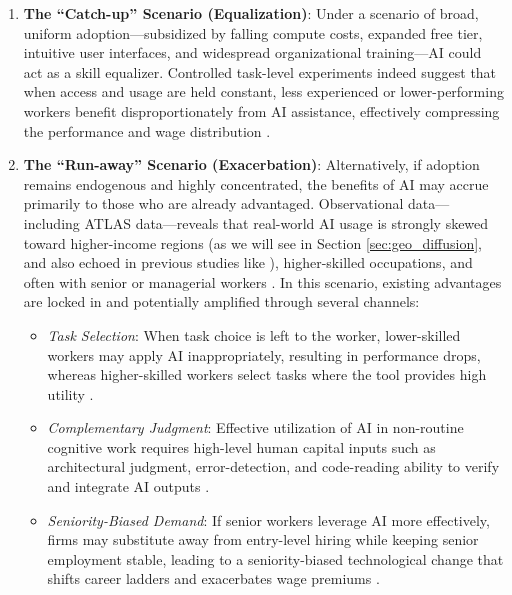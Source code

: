\documentclass[11pt,a4paper]{article}
\begin{document}
\begin{enumerate}
    \item \textbf{The ``Catch-up'' Scenario (Equalization)}: Under a scenario of broad, uniform adoption---subsidized by falling compute costs, expanded free tier, intuitive user interfaces, and widespread organizational training---AI could act as a skill equalizer. Controlled task-level experiments indeed suggest that when access and usage are held constant, less experienced or lower-performing workers benefit disproportionately from AI assistance, effectively compressing the performance and wage distribution \citep[e.g.,][]{Brynjolfsson2025, Noy2023, NBERw34851}.
    
    \item \textbf{The ``Run-away'' Scenario (Exacerbation)}: Alternatively, if adoption remains endogenous and highly concentrated, the benefits of AI may accrue primarily to those who are already advantaged. Observational data---including ATLAS data---reveals that real-world AI usage is strongly skewed toward higher-income regions (as we will see in Section \ref{sec:geo_diffusion}, and also echoed in previous studies like \citet{appelmccrorytamkin2025geoapi}), higher-skilled occupations, and often with senior or managerial workers \citep{anthropic2026aeiv5}. In this scenario, existing advantages are locked in and potentially amplified through several channels:
    \begin{itemize}
        \item \textit{Task Selection}: When task choice is left to the worker, lower-skilled workers may apply AI inappropriately, resulting in performance drops, whereas higher-skilled workers select tasks where the tool provides high utility \citep[e.g.,][]{Otis2026}.
        \item \textit{Complementary Judgment}: Effective utilization of AI in non-routine cognitive work requires high-level human capital inputs such as architectural judgment, error-detection, and code-reading ability to verify and integrate AI outputs \citep{beane2025human, paradis2024doesaiimpactdevelopment}.
        \item \textit{Seniority-Biased Demand}: If senior workers leverage AI more effectively, firms may substitute away from entry-level hiring while keeping senior employment stable, leading to a seniority-biased technological change that shifts career ladders and exacerbates wage premiums \citep{HosseiniMaasoum2025}.
    \end{itemize}
\end{enumerate}
\end{document}
